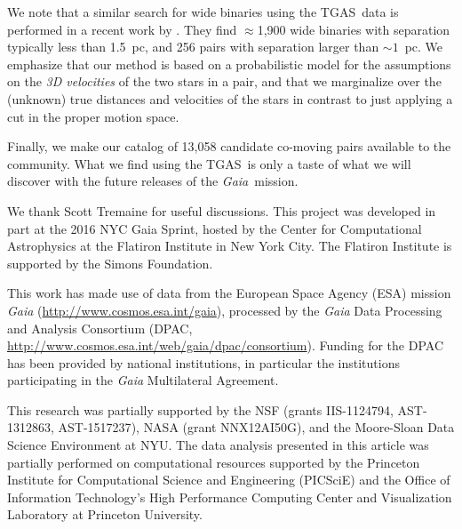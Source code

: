 \documentclass[manuscript, letterpaper]{aastex6}
\newcommand{\project}[1]{\textsl{#1}}
\newcommand{\acronym}[1]{{\small{#1}}}
\newcommand{\gaia}{\project{Gaia}}
\newcommand{\tgas}{\acronym{TGAS}}
\begin{document}
We note that a similar search for wide binaries using the \tgas\ data is performed
in a recent work by \citet{2016arXiv161107883O}. They find $\approx$1,900 wide binaries
with separation typically less than 1.5~pc, and 256 pairs with separation larger than
$\sim 1$~pc.
We emphasize that our method is based on a probabilistic model for the assumptions
on the \emph{3D velocities} of the two stars in a pair, and that we
marginalize over the (unknown) true distances and velocities of the stars
in contrast to just applying a cut in the proper motion space.

Finally, we make our catalog of 13,058 candidate co-moving pairs available to the
community.
What we find using the \tgas\ is only a taste of what we will discover with
the future releases of the \gaia\ mission.


\acknowledgements

We thank Scott Tremaine for useful discussions.
This project was developed in part at the 2016 NYC Gaia Sprint, hosted by the Center for
Computational Astrophysics at the Flatiron Institute in New York City. The
Flatiron Institute is supported by the Simons Foundation.

This work has made use of data from the European Space Agency (ESA) mission
{\it Gaia} (\url{http://www.cosmos.esa.int/gaia}), processed by the {\it Gaia}
Data Processing and Analysis Consortium (DPAC,
\url{http://www.cosmos.esa.int/web/gaia/dpac/consortium}). Funding for the DPAC
has been provided by national institutions, in particular the institutions
participating in the {\it Gaia} Multilateral Agreement.

This research was partially supported by the \acronym{NSF} (grants
  \acronym{IIS-1124794}, \acronym{AST-1312863}, \acronym{AST-1517237}),
  \acronym{NASA} (grant \acronym{NNX12AI50G}),
  and the Moore-Sloan Data Science Environment at \acronym{NYU}. The data
analysis presented in this article was partially performed on computational
resources supported by the Princeton Institute for Computational Science and
Engineering (PICSciE) and the Office of Information Technology's High
Performance Computing Center and Visualization Laboratory at Princeton
University.

\end{document}
